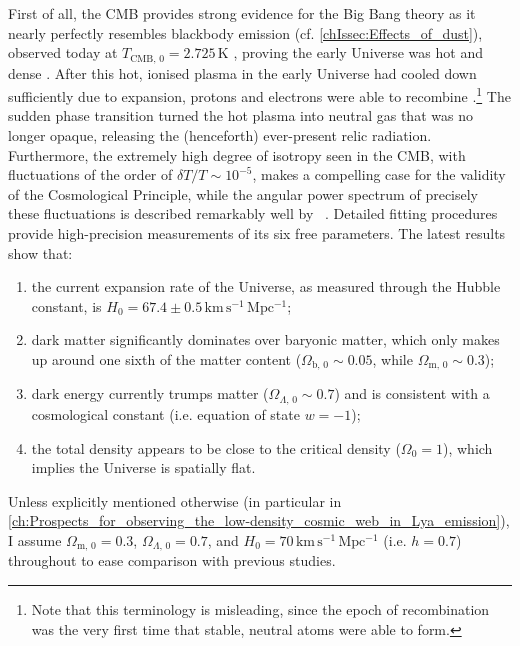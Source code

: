 First of all, the CMB provides strong evidence for the Big Bang theory as it nearly perfectly resembles blackbody emission (cf. \cref{chIssec:Effects_of_dust}), observed today at $T_{\text{CMB}, \, 0} = 2.725 \, \mathrm{K}$ \citep[e.g.][]{2009ApJ...707..916F}, proving the early Universe was hot and dense \citep[in fact, the existence of the CMB in a Big Bang model had been predicted before its discovery;][]{1949RvMP...21..367G}. After this hot, ionised plasma in the early Universe had cooled down sufficiently due to expansion, protons and electrons were able to recombine \citep[at a redshift of $z \sim \num{1100}$; e.g.][]{1985A&A...149..144J}.\footnote{Note that this terminology is misleading, since the epoch of recombination was the very first time that stable, neutral atoms were able to form.} The sudden phase transition turned the hot plasma into neutral gas that was no longer opaque, releasing the (henceforth) ever-present relic radiation. Furthermore, the extremely high degree of isotropy seen in the CMB, with fluctuations of the order of $\delta T / T \sim 10^{-5}$, makes a compelling case for the validity of the Cosmological Principle, while the angular power spectrum of precisely these fluctuations is described remarkably well by \LCDM\ \citep{2020A&A...641A...1P}. Detailed fitting procedures provide high-precision measurements of its six free parameters. The latest results \citep[e.g.][]{2020A&A...641A...6P} show that:
\begin{enumerate}[label=(\roman*)]
    \item the current expansion rate of the Universe, as measured through the Hubble constant, is $H_0 = 67.4 \pm 0.5 \, \mathrm{km \, s^{-1} \, Mpc^{-1}}$;
    \item dark matter significantly dominates over baryonic matter, which only makes up around one sixth of the matter content ($\Omega_{\text{b}, \, 0} \sim 0.05$, while $\Omega_{\text{m}, \, 0} \sim 0.3$);
    \item dark energy currently trumps matter ($\Omega_{\Lambda, \, 0} \sim 0.7$) and is consistent with a cosmological constant (i.e. equation of state $w = -1$);
    \item the total density appears to be close to the critical density ($\Omega_0 = 1$), which implies the Universe is spatially flat.
\end{enumerate}

Unless explicitly mentioned otherwise (in particular in \cref{ch:Prospects_for_observing_the_low-density_cosmic_web_in_Lya_emission}), I assume $\Omega_{\text{m}, \, 0} = 0.3$, $\Omega_{\Lambda, \, 0} = 0.7$, and $H_0 = 70 \, \mathrm{km \, s^{-1} \, Mpc^{-1}}$ (i.e. $h = 0.7$) throughout to ease comparison with previous studies.

